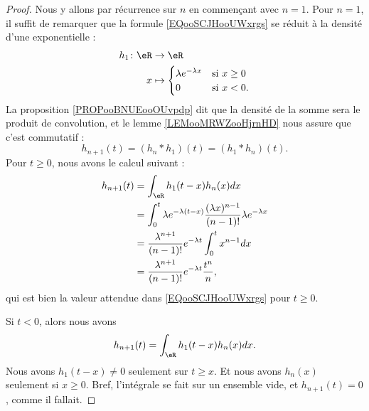 \begin{proof}
	Nous y allons par récurrence sur \( n\) en commençant avec \( n=1\). Pour \( n=1\), il suffit de remarquer que la formule \eqref{EQooSCJHooUWxrgs} se réduit à la densité d'une exponentielle :
	\begin{equation}
		\begin{aligned}
			h_1\colon \eR & \to \eR                                             \\
			x             & \mapsto \begin{cases}
				                        \lambda e^{-\lambda x} & \text{si } x\geq 0 \\
				                        0                      & \text{si } x<0.
			                        \end{cases}
		\end{aligned}
	\end{equation}
	La proposition \ref{PROPooBNUEooOUvpdp} dit que la densité de la somme sera le produit de convolution, et le lemme \ref{LEMooMRWZooHjrnHD} nous assure que c'est commutatif :
	\begin{equation}
		h_{n+1}(t)=(h_n*h_1)(t)=(h_1*h_n)(t).
	\end{equation}
	Pour \( t\geq 0\), nous avons le calcul suivant :
	\begin{subequations}
		\begin{align}
			h_{n+1}(t) & =\int_{\eR}h_1(t-x)h_n(x)dx                                                                  \\
			           & =\int_0^t\lambda e^{-\lambda(t-x)}\frac{ (\lambda x)^{n-1} }{ (n-1)! }\lambda e^{-\lambda x} \\
			           & = \frac{ \lambda^{n+1} }{ (n-1)! }e^{-\lambda t}\int_0^tx^{n-1}dx                            \\
			           & =\frac{ \lambda^{n+1} }{ (n-1)! }e^{-\lambda t}\frac{ t^n }{ n },
		\end{align}
	\end{subequations}
	qui est bien la valeur attendue dans \eqref{EQooSCJHooUWxrgs} pour \( t\geq 0\).

	Si \( t<0\), alors nous avons
	\begin{equation}
		h_{n+1}(t)=\int_{\eR}h_1(t-x)h_n(x)dx.
	\end{equation}
	Nous avons \( h_1(t-x)\neq 0\) seulement sur \( t\geq x\). Et nous avons \( h_n(x)\) seulement si \( x\geq 0\). Bref, l'intégrale se fait sur un ensemble vide, et \( h_{n+1}(t)=0\), comme il fallait.
\end{proof}


